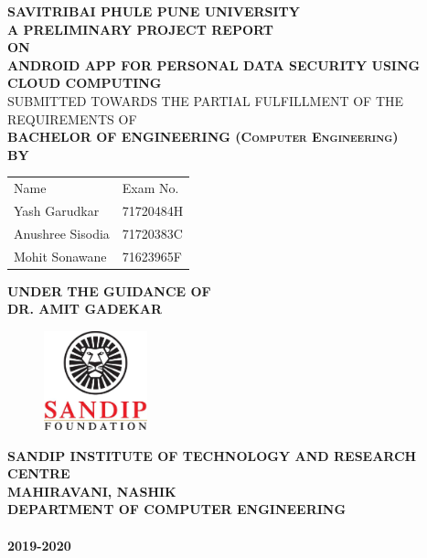 \documentclass[12pt,a4paper]{report}
\begin{document}
\renewcommand{\headrulewidth}{0.4pt}
\renewcommand{\footrulewidth}{0.4pt}

\newpage
\begin{center}
\thispagestyle{empty}
\large{\textbf{SAVITRIBAI PHULE PUNE UNIVERSITY }}\\[0.5cm]
\large{\textbf{A PRELIMINARY PROJECT REPORT\\ \large{ON}}}\\[0.3cm]
\large{\textsc {\textbf{ANDROID APP FOR PERSONAL DATA SECURITY USING CLOUD COMPUTING}}}\\[0.7cm]
\large{\textsc{SUBMITTED TOWARDS THE PARTIAL FULFILLMENT OF THE REQUIREMENTS OF}}\\[0.2cm]
{\textsc {\textbf{BACHELOR OF ENGINEERING (Computer Engineering)}}}\\[0.1cm]
\large{\textbf{BY}}\\

\begin{table}[h]
\centering
\large{
\begin{tabular}{ll}
Name & Exam No.\\
Yash Garudkar & 71720484H\\
Anushree Sisodia & 71720383C\\
Mohit Sonawane & 71623965F\\
\end{tabular}
}
\end{table}
\large{\textbf{UNDER THE GUIDANCE OF}}\\[0.3cm]
\large{\textbf{DR. AMIT GADEKAR}}\\[0.5cm]
\begin{figure}[h]
\begin{center}
\includegraphics[width=3cm, angle=0]{sandiplogo.jpg}
\end{center}
\end{figure}
\textbf{SANDIP INSTITUTE OF TECHNOLOGY AND RESEARCH CENTRE}\\
\large{\textbf{MAHIRAVANI, NASHIK}}\\[0.3cm]
\large{\textbf{DEPARTMENT OF COMPUTER ENGINEERING}}\\
\large{\textbf{\\2019-2020}}
\end{center}
\end{document}
